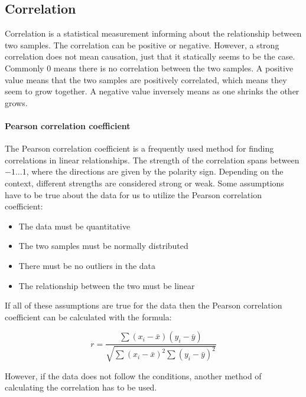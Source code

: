 \subsection{Correlation}
Correlation is a statistical measurement informing about the relationship between two samples. The correlation can be positive or negative. However, a strong correlation does not mean causation, just that it statically seems to be the case. Commonly $0$ means there is no correlation between the two samples. A positive value means that the two samples are positively correlated, which means they seem to grow together. A negative value inversely means as one shrinks the other grows.

\paragraph{Pearson correlation coefficient} The Pearson correlation coefficient is a frequently used method for finding correlations in linear relationships\cite{armstrong2019should}. The strength of the correlation spans between $-1 \dotsc 1$, where the directions are given by the polarity sign. Depending on the context, different strengths are considered strong or weak. Some assumptions have to be true about the data for us to utilize the Pearson correlation coefficient:

\begin{itemize}
    \item The data must be quantitative
    \item The two samples must be normally distributed
    \item There must be no outliers in the data
    \item The relationship between the two must be linear
\end{itemize}

If all of these assumptions are true for the data then the Pearson correlation coefficient can be calculated with the formula:

\begin{equation}
    r=\frac{\sum{(x_i-\bar{x})(y_i-\bar{y})}}{\sqrt{\sum{(x_i-\bar{x})^2}\sum{(y_i-\bar{y})^2}}}
\end{equation}

However, if the data does not follow the conditions, another method of calculating the correlation has to be used. 

